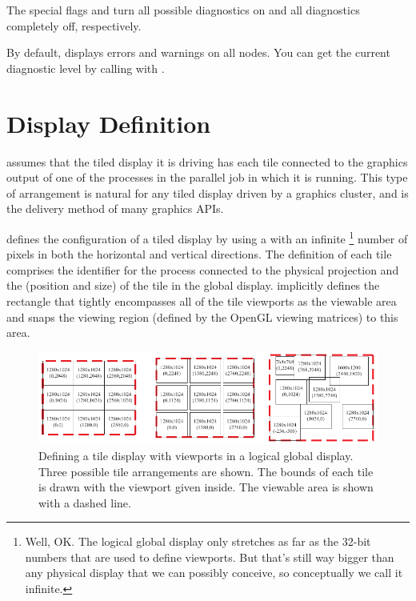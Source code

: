 The special flags  and  turn
all possible diagnostics on and all diagnostics completely off,
respectively.

By default, \IceT displays errors and warnings on all nodes.  You can get
the current diagnostic level by calling  with
.



\section{Display Definition}
\label{sec:Basic_Usage:Display_Definition}


\IceT assumes that the tiled display it is driving has each tile connected
to the graphics output of one of the processes in the parallel job in which
it is running.  This type of arrangement is natural for any tiled display
driven by a graphics cluster, and is the delivery method of many graphics
APIs. %

\IceT defines the configuration of a tiled display by using a
 with an infinite \footnote{Well, OK.  The logical global display
  only stretches as far as the 32-bit numbers that are used to define
  viewports.  But that's still way bigger than any physical display that we
  can possibly conceive, so conceptually we call it infinite.} number of
pixels in both the horizontal and vertical directions.  The definition of
each tile comprises the identifier for the process connected to the
physical projection and the  (position
and size) of the tile in the global display.  \IceT implicitly defines the
rectangle that tightly encompasses all of the tile viewports as the
viewable area and snaps the viewing region (defined by the OpenGL viewing
matrices) to this area.

\begin{figure}
  \centering
  \includegraphics{images/ExampleTileConfig}
  \caption[Defining a tile display.]{Defining a tile display with viewports
    in a logical global display.  Three possible tile arrangements are
    shown.  The bounds of each tile is drawn with the viewport given
    inside.  The viewable area is shown with a dashed line.}
  \label{fig:BasicUsage:tile_layout}
\end{figure}

